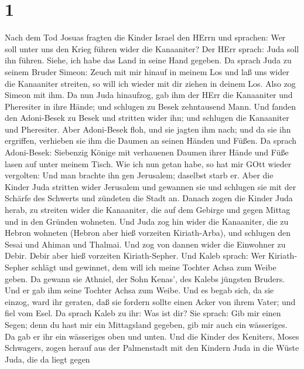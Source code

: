 \hypertarget{section}{%
\section{1}\label{section}}

 Nach dem Tod Josuas fragten die Kinder Israel den HErrn und
sprachen: Wer soll unter uns den Krieg führen wider die Kanaaniter?
 Der HErr sprach: Juda soll ihn führen. Siehe, ich habe das
Land in seine Hand gegeben.  Da sprach Juda zu seinem Bruder
Simeon: Zeuch mit mir hinauf in meinem Los und laß uns wider die
Kanaaniter streiten, so will ich wieder mit dir ziehen in deinem Los.
Also zog Simeon mit ihm.  Da nun Juda hinaufzog, gab ihm der
HErr die Kanaaniter und Pheresiter in ihre Hände; und schlugen zu Besek
zehntausend Mann.  Und fanden den Adoni-Besek zu Besek und
stritten wider ihn; und schlugen die Kanaaniter und Pheresiter.
 Aber Adoni-Besek floh, und sie jagten ihm nach; und da sie
ihn ergriffen, verhieben sie ihm die Daumen an seinen Händen und Füßen.
 Da sprach Adoni-Besek: Siebenzig Könige mit verhauenen
Daumen ihrer Hände und Füße lasen auf unter meinem Tisch. Wie ich nun
getan habe, so hat mir GOtt wieder vergolten: Und man brachte ihn gen
Jerusalem; daselbst starb er.  Aber die Kinder Juda stritten
wider Jerusalem und gewannen sie und schlugen sie mit der Schärfe des
Schwerts und zündeten die Stadt an.  Danach zogen die Kinder
Juda herab, zu streiten wider die Kanaaniter, die auf dem Gebirge und
gegen Mittag und in den Gründen wohneten.  Und Juda zog hin
wider die Kanaaniter, die zu Hebron wohneten (Hebron aber hieß vorzeiten
Kiriath-Arba), und schlugen den Sesai und Ahiman und Thalmai.
 Und zog von dannen wider die Einwohner zu Debir. Debir
aber hieß vorzeiten Kiriath-Sepher.  Und Kaleb sprach: Wer
Kiriath-Sepher schlägt und gewinnet, dem will ich meine Tochter Achsa
zum Weibe geben.  Da gewann sie Athniel, der Sohn Kenas',
des Kalebs jüngsten Bruders. Und er gab ihm seine Tochter Achsa zum
Weibe.  Und es begab sich, da sie einzog, ward ihr geraten,
daß sie fordern sollte einen Acker von ihrem Vater; und fiel vom Esel.
Da sprach Kaleb zu ihr: Was ist dir?  Sie sprach: Gib mir
einen Segen; denn du hast mir ein Mittagsland gegeben, gib mir auch ein
wässeriges. Da gab er ihr ein wässeriges oben und unten. 
Und die Kinder des Keniters, Moses Schwagers, zogen herauf aus der
Palmenstadt mit den Kindern Juda in die Wüste Juda, die da liegt gegen
